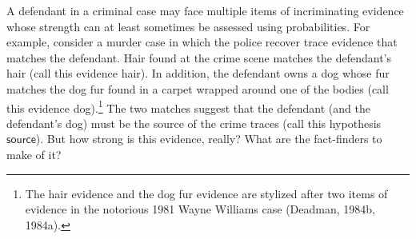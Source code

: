 \documentclass[
  10pt,
  dvipsnames,enabledeprecatedfontcommands]{scrartcl}
\begin{document}
A defendant in a criminal case may face multiple items of incriminating
evidence whose strength can at least sometimes be assessed using
probabilities. For example, consider a murder case in which the police
recover trace evidence that matches the defendant. Hair found at the
crime scene matches the defendant's hair (call this evidence
\textsf{hair}). In addition, the defendant owns a dog whose fur matches
the dog fur found in a carpet wrapped around one of the bodies (call
this evidence \textsf{dog}).\footnote{The hair evidence and the dog fur
  evidence are stylized after two items of evidence in the notorious
  1981 Wayne Williams case (Deadman, 1984b, 1984a).} The two matches
suggest that the defendant (and the defendant's dog) must be the source
of the crime traces (call this hypothesis \(\mathsf{source}\)). But how
strong is this evidence, really? What are the fact-finders to make of
it?
\end{document}
